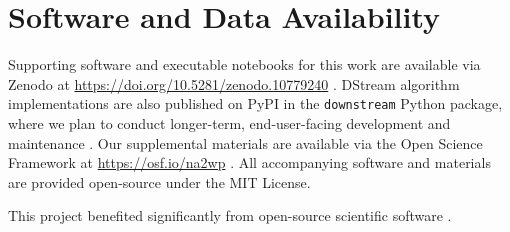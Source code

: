 \section{Software and Data Availability}
\label{sec:materials}

Supporting software and executable notebooks for this work are available via Zenodo at \url{https://doi.org/10.5281/zenodo.10779240} \citep{moreno2024hsurf}.
DStream algorithm implementations are also published on PyPI in the \texttt{downstream} Python package, where we plan to conduct longer-term, end-user-facing development and maintenance \citep{moreno2024downstream}.
Our supplemental materials are available via the Open Science Framework at \url{https://osf.io/na2wp} \citep{foster2017open}.
All accompanying software and materials are provided open-source under the MIT License.

This project benefited significantly from open-source scientific software \citep{2020SciPy-NMeth,harris2020array,reback2020pandas,mckinney-proc-scipy-2010,waskom2021seaborn,hunter2007matplotlib,moreno2023teeplot}.
